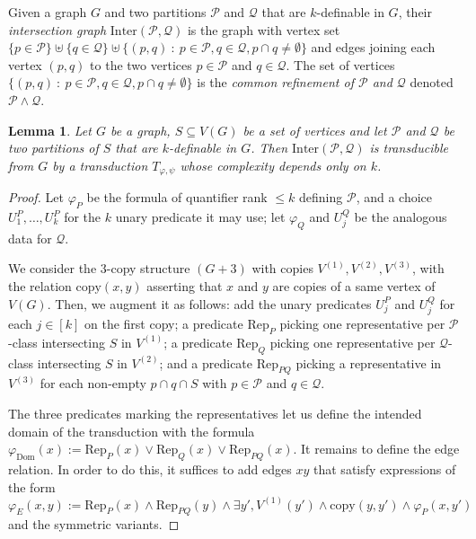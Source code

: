 \documentclass[11pt]{article}
\newtheorem{lemma}[theorem]{Lemma}
\theoremstyle{definition}
\renewcommand{\leq}{\leqslant}
\let\phi\varphi
\newcommand{\Pp}{\mathcal{P}}
\newcommand{\Qq}{\mathcal{Q}}
\newcommand{\remph}[1]{{\color{red} \emph{#1}}}
\begin{document}
Given a graph $G$ and two partitions $\mathcal P$ and $\mathcal Q$ that are $k$-definable in $G$, their \remph{intersection graph} $\text{Inter}(\mathcal P, \mathcal Q)$ is the graph with vertex set $\{p \in \mathcal P\} \uplus \{q \in \mathcal Q\} \uplus \{(p,q) ~:~ p \in \mathcal P, q \in \mathcal Q, p \cap q \neq \emptyset\}$ and edges joining each vertex $(p, q)$ to the two vertices $p \in \mathcal P$ and $q \in \mathcal Q$.
The set of vertices $\{(p,q) ~:~ p \in \mathcal P, q \in \mathcal Q, p \cap q \neq \emptyset\}$ is the \remph{common refinement of $\mathcal P$ and $\mathcal Q$} denoted $\mathcal P \wedge \mathcal Q$.

\begin{lemma}\label{lem:transInter}
    Let $G$ be a graph, $S \subseteq V(G)$ be a set of vertices and let $\mathcal P$ and $\mathcal Q$ be two  partitions of $S$ that are $k$-definable in $G$. Then $\text{Inter}(\Pp , \Qq)$ is transducible from $G$ by a transduction $T_{\phi, \psi}$ whose complexity depends only on $k$.
\end{lemma}
\begin{proof}

Let $\phi_P$ be the formula of quantifier rank $\leq k$ defining $\mathcal P$, and a choice $U_1^P, \ldots, U_k^P$ for the $k$ unary predicate it may use; let $\phi_Q$ and $U_j^Q$ be the analogous data for $\mathcal Q$.

We consider the $3$-copy structure $(G+3)$ with copies $V^{(1)}, V^{(2)}, V^{(3)}$, with the relation $\text{copy}(x, y)$ asserting that $x$ and $y$ are copies of a same vertex of $V(G)$. Then, we augment it as follows: add the unary predicates $U_j^P$ and $U_j^Q$ for each $j \in [k]$ on the first copy; a predicate $\mathrm{Rep}_P$ picking one representative per $\mathcal P$-class intersecting $S$ in $V^{(1)}$; a predicate $\mathrm{Rep}_Q$ picking one representative per $\mathcal Q$-class intersecting $S$ in $V^{(2)}$; and a predicate $\mathrm{Rep}_{PQ}$ picking a representative in $V^{(3)}$ for each non-empty $p \cap q \cap S$ with $p \in \mathcal P$ and $q \in \mathcal Q$.

The three predicates marking the representatives let us define the intended domain of the transduction with the formula $\phi_{\text{Dom}}(x) := \mathrm{Rep}_{P}(x) \vee \mathrm{Rep}_{Q}(x) \vee \mathrm{Rep}_{PQ}(x)$.
It remains to define the edge relation.
In order to do this, it suffices to add edges $xy$ that satisfy expressions of the form
\[
\phi_E(x, y) := \mathrm{Rep}_{P}(x) \wedge \mathrm{Rep}_{PQ}(y) \wedge \exists y', V^{(1)}(y') \wedge \text{copy}(y, y') \wedge  \phi_P(x, y')
\]
and the symmetric variants.
\end{proof}
\end{document}
